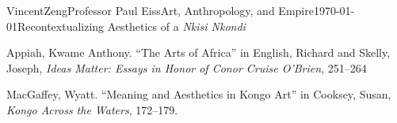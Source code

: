 \documentclass[12pt]{article}
\begin{document}
\begin{mla}{Vincent}{Zeng}{Professor Paul Eiss}{Art, Anthropology, and
    Empire}{\today}{Recontextualizing Aesthetics of a \textit{Nkisi Nkondi}}

    
\begin{workscited}
  \bibent
  Appiah, Kwame Anthony. ``The Arts of Africa'' in English, Richard and Skelly, Joseph, \textit{Ideas Matter: Essays in Honor of Conor Cruise O'Brien}, 251--264

  \bibent
  MacGaffey, Wyatt. ``Meaning and Aesthetics in Kongo Art'' in Cooksey, Susan, \textit{Kongo Across the Waters}, 172--179.

\end{workscited}
\end{mla}
\end{document}
